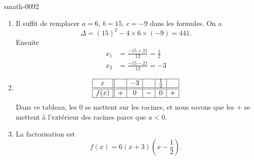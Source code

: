 
\begin{corrige}{smath-0092}

    \begin{enumerate}
        \item
            Il suffit de remplacer \( a=6\), \( b=15\), \( c=-9\) dans les formules. On a
            \begin{equation}
                \Delta=(15)^2-4\times 6\times (-9)=441.
            \end{equation}
            Ensuite
            \begin{subequations}
                \begin{align}
                    x_1&=\frac{ -15+21 }{ 12 }=\frac{ 1 }{2}\\
                    x_2&=\frac{ -15-21 }{ 12 }=-3
                \end{align}
            \end{subequations}
        \item
            \begin{equation*}
                \begin{array}[]{|c||c|c|c|c|c|}
                    \hline
                    x&&-3&&\frac{ 1 }{2}&\\
                      \hline\hline
                      f(x)&+&0&-&0&+\\ 
                      \hline 
                       \end{array}
                   \end{equation*}
                   Dans ce tableau, les \( 0\) se mettent sur les racines, et nous savons que les \( +\) se mettent à l'extérieur des racines parce que \( a<0\).
               \item

                   La factorisation est
                   \begin{equation}
                       f(x)=6(x+3)(x-\frac{ 1 }{2}).
                   \end{equation}
                   
    \end{enumerate}

\end{corrige}
